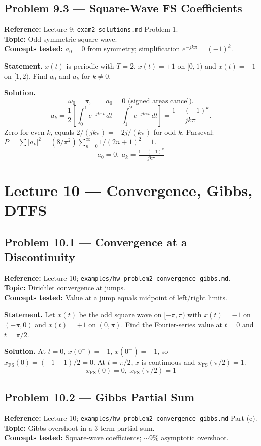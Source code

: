 \documentclass[11pt]{article}
\begin{document}
\subsection{Problem 9.3 --- Square-Wave FS Coefficients}
\textbf{Reference:} Lecture 9; \texttt{exam2\_solutions.md} Problem 1.\\
\textbf{Topic:} Odd-symmetric square wave.\\
\textbf{Concepts tested:} $a_0=0$ from symmetry; simplification $e^{-jk\pi}=(-1)^k$.

\textbf{Statement.} $x(t)$ is periodic with $T=2$, $x(t)=+1$ on $[0,1)$ and $x(t)=-1$ on $[1,2)$. Find $a_0$ and $a_k$ for $k\ne 0$.

\textbf{Solution.}
\[
\omega_0 = \pi,\qquad a_0 = 0 \text{ (signed areas cancel).}
\]
\[
a_k = \frac{1}{2}\left[\int_0^1 e^{-jk\pi t}\,dt - \int_1^2 e^{-jk\pi t}\,dt\right] = \frac{1-(-1)^k}{jk\pi}.
\]
Zero for even $k$, equals $2/(jk\pi) = -2j/(k\pi)$ for odd $k$. Parseval: $P = \sum|a_k|^2 = (8/\pi^2)\sum_{n=0}^\infty 1/(2n+1)^2 = 1$. \checkmark
\[
\boxed{\,a_0=0,\ a_k = \tfrac{1-(-1)^k}{jk\pi}\,}
\]

\section{Lecture 10 --- Convergence, Gibbs, DTFS}

\subsection{Problem 10.1 --- Convergence at a Discontinuity}
\textbf{Reference:} Lecture 10; \texttt{examples/hw\_problem2\_convergence\_gibbs.md}.\\
\textbf{Topic:} Dirichlet convergence at jumps.\\
\textbf{Concepts tested:} Value at a jump equals midpoint of left/right limits.

\textbf{Statement.} Let $x(t)$ be the odd square wave on $[-\pi,\pi)$ with $x(t)=-1$ on $(-\pi,0)$ and $x(t)=+1$ on $(0,\pi)$. Find the Fourier-series value at $t=0$ and $t=\pi/2$.

\textbf{Solution.}
At $t=0$, $x(0^-)=-1$, $x(0^+)=+1$, so $x_\mathrm{FS}(0) = (-1+1)/2 = 0$. At $t=\pi/2$, $x$ is continuous and $x_\mathrm{FS}(\pi/2) = 1$.
\[
\boxed{\,x_\mathrm{FS}(0)=0,\ x_\mathrm{FS}(\pi/2)=1\,}
\]

\subsection{Problem 10.2 --- Gibbs Partial Sum}
\textbf{Reference:} Lecture 10; \texttt{examples/hw\_problem2\_convergence\_gibbs.md} Part (c).\\
\textbf{Topic:} Gibbs overshoot in a 3-term partial sum.\\
\textbf{Concepts tested:} Square-wave coefficients; $\sim$9\% asymptotic overshoot.
\end{document}
